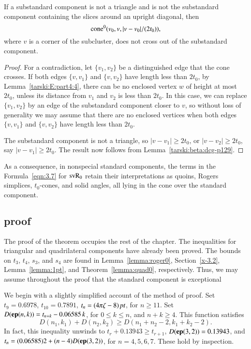 \begin{lemma}
    \label{lemma:no-cross}
If a substandard component is not a triangle and is not  the substandard component
containing the slices around an upright diagonal, then
   $${\operatorname{cone}}^0(v_0,v,|v-v_0|/(2t_0)),$$
where $v$ is a corner of the subcluster,
does not cross out of the substandard component.

\end{lemma}

\begin{proof}
For a contradiction, let $\{v_1,v_2\}$ be a distinguished edge that
the cone crosses. If both edges $\{v,v_1\}$ and $\{v,v_2\}$ have
length less than $2t_0$, by Lemma~\ref{tarski:E:part4:4},
there can be no enclosed vertex $w$ of
height at most $2t_0$, unless its distance from $v_1$ and $v_2$ is
less than $2t_0$.
In this case, we can replace $\{v_1,v_2\}$ by an edge of the
substandard component closer to $v$, so without loss of generality we may
assume that there are no enclosed vertices when both edges
$\{v,v_1\}$ and $\{v,v_2\}$ have length less than $2t_0$.

The substandard component is not a triangle, so $|v-v_1|\ge 2t_0$, or
$|v-v_2|\ge 2t_0$, say $|v-v_1|\ge 2t_0$.  The result now follows
from Lemma~\ref{tarski:beta:dcg-p129}.
\end{proof}

As a consequence, in nonspecial standard components, the terms in the
Formula~\ref{eqn:3.7} for ${\operatorname{svR}}_0$ retain their interpretations as
quoins, Rogers simplices, $t_0$-cones, and solid angles, all lying
in the cone over the standard component.


\subsection{proof} %

The proof of the theorem occupies the rest of the chapter. The
inequalities for triangular and quadrilateral components have already
been proved. The bounds on $t_3$, $t_4$, $s_3$, and $s_4$ are
found in Lemma~\ref{lemma:roger0}, Section~\ref{x-3.2},
Lemma~\ref{lemma:1pt}, and Theorem~\ref{lemma:quad0},
respectively. Thus, we may assume throughout the proof that the
standard component is exceptional

We begin with a slightly simplified account of the method of
proof. Set $t_9=0.6978$, $t_{10}= 0.7891$, $t_n=(4\pi\zeta-8)\,\hbox{\it pt}$, for
$n\ge 11$. Set $D({\operatorname{\bf ep}}{(n,k)}) = t_{n+k} - 0.06585\,k$, for $0\le k\le n$,
and $n+k\ge 4$. This function satisfies
    \begin{equation}
    D(n_1,k_1)+D(n_2,k_2)\ge D(n_1+n_2-2,k_1+k_2-2).
    \label{eqn:D-superadd}
    \end{equation}
In fact, this inequality unwinds to $t_r+0.13943\ge t_{r+1}$,
$D({\operatorname{\bf ep}}{(3,2)})=0.13943$, and $t_n =(0.06585)2+(n-4)D({\operatorname{\bf ep}}{(3,2)})$, for $n=4,5,6,7$.
These hold  by inspection.

